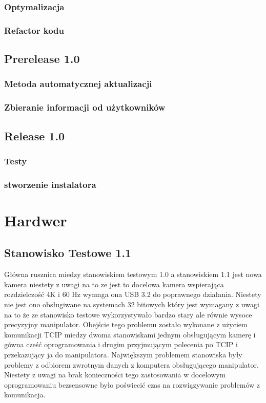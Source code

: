 \documentclass[11pt,a4paper]{article}
\begin{document}
    \subsubsection{Optymalizacja}

    \subsubsection{Refactor kodu}

    \subsection{Prerelease 1.0}

    \subsubsection{Metoda automatycznej aktualizacji}

    \subsubsection{Zbieranie informacji od użytkowników}

    \subsection{Release 1.0}

    \subsubsection{Testy}

    \subsubsection{stworzenie instalatora}


    \newpage


    \section{Hardwer}

    \subsection{Stanowisko Testowe 1.1}
    Główna rusznica miedzy stanowiskiem testowym 1.0 a stanowiskiem 1.1 jest nowa kamera niestety z uwagi na to ze jest to docelowa kamera wspierająca rozdzielczość 4K i 60 Hz wymaga ona USB 3.2 do poprawnego działania. Niestety nie jest ono obsługiwane na systemach 32 bitowych który jest wymagany z uwagi na to że ze stanowisko testowe wykorzystywało bardzo stary ale równie wysoce precyzyjny manipulator.
    Obejście tego problemu zostało wykonane z użyciem komunikacji TCIP miedzy dwoma stanowiskami jednym obsługującym kamerę i gówna cześć oprogramowania i drugim przyjmującym polecenia po TCIP i przekazujący ja do manipulatora. Największym problemem stanowiska były problemy z odbiorem zwrotnym danych z komputera obsługującego manipulator. Niestety z uwagi na brak konieczności tego zastosowania w docelowym oprogramowaniu bezsensowne było poświecić czas na rozwiązywanie problemów z komunikacja.
\end{document}
